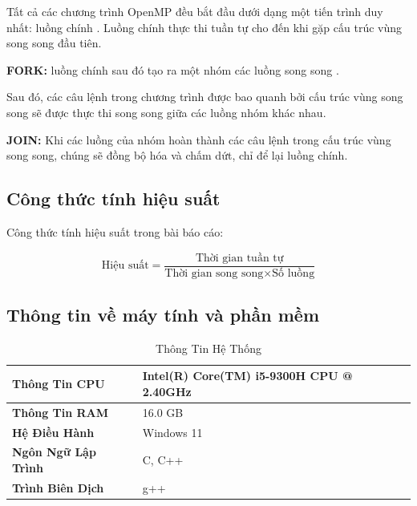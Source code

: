 Tất cả các chương trình OpenMP đều bắt đầu dưới dạng một tiến trình duy nhất: luồng chính . Luồng chính thực thi tuần tự cho đến khi gặp cấu trúc vùng song song đầu tiên.


 
\textbf{FORK:}   luồng chính sau đó tạo ra một nhóm các luồng song song .

Sau đó, các câu lệnh trong chương trình được bao quanh bởi cấu trúc vùng song song sẽ được thực thi song song giữa các luồng nhóm khác nhau.

\textbf{JOIN:}         Khi các luồng của nhóm hoàn thành các câu lệnh trong cấu trúc vùng song song, chúng sẽ đồng bộ hóa và chấm dứt, chỉ để lại luồng chính.

 
 
 
 
\newpage
\subsection{Công thức tính hiệu suất}


Công thức tính hiệu suất trong bài báo cáo: 
 

\[\text{{Hiệu suất}} = \frac{{\text{{Thời gian tuần tự}}}}{{\text{{Thời gian song song}} \times \text{{Số luồng}}}}\]
 
 
\subsection{Thông tin về máy tính và phần mềm}


\begin{table}[h]
    \centering
    \begin{tabular}{|l|l|}
        \hline
        \textbf{Thông Tin CPU} & Intel(R) Core(TM) i5-9300H CPU @ 2.40GHz \\
        \hline
        \textbf{Thông Tin RAM} & 16.0 GB \\
        \hline
        \textbf{Hệ Điều Hành} & Windows 11 \\
        \hline
        \textbf{Ngôn Ngữ Lập Trình} & C, C++ \\
        \hline
        \textbf{Trình Biên Dịch} & g++ \\
        \hline
    \end{tabular}
    \caption{Thông Tin Hệ Thống}
    \label{table:system-info}
\end{table}